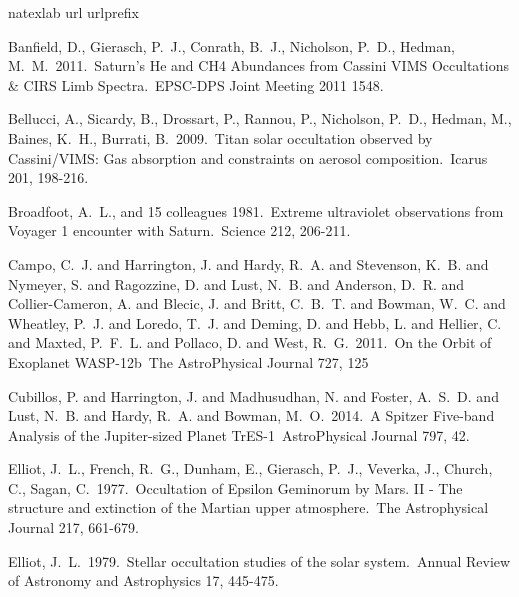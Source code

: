 \documentclass[preprint]{aastex}
\begin{document}
\begin{thebibliography}{28}
\expandafter\ifx\csname natexlab\endcsname\relax\def\natexlab#1{#1}\fi
\expandafter\ifx\csname url\endcsname\relax
 \def\url#1{\texttt{#1}}\fi
\expandafter\ifx\csname urlprefix\endcsname\relax\def\urlprefix{URL }\fi
\providecommand{\eprint}[2][]{\url{#2}}

 Banfield, D., Gierasch, P.~J., 
Conrath, B.~J., Nicholson, P.~D., Hedman, M.~M.\ 2011.\ Saturn's He and CH4 
Abundances from Cassini VIMS Occultations \& CIRS Limb Spectra.\ EPSC-DPS 
Joint Meeting 2011 1548. 

 Bellucci, A., Sicardy, B., Drossart, P., 
Rannou, P., Nicholson, P.~D., Hedman, M., Baines, K.~H., Burrati, B.\ 2009.\ 
Titan solar occultation observed by Cassini/VIMS: Gas absorption and 
constraints on aerosol composition.\ Icarus 201, 198-216. 

 Broadfoot, A.~L., and 15 
colleagues 1981.\ Extreme ultraviolet observations from Voyager 1 encounter with 
Saturn.\ Science 212, 206-211. 

 {Campo}, C.~J. and {Harrington}, J.
and {Hardy}, R.~A. and {Stevenson}, K.~B. and {Nymeyer}, S. and {Ragozzine}, D.
and {Lust}, N.~B. and {Anderson}, D.~R. and {Collier-Cameron}, A. and {Blecic},
J. and {Britt}, C.~B.~T. and {Bowman}, W.~C. and {Wheatley}, P.~J. and
{Loredo}, T.~J. and {Deming}, D. and {Hebb}, L. and {Hellier}, C. and {Maxted},
P.~F.~L. and {Pollaco}, D. and {West}, R.~G.\ 2011.\ On the Orbit of Exoplanet
WASP-12b\ The AstroPhysical Journal 727, 125

 {Cubillos}, P. and {Harrington}, J. and
{Madhusudhan}, N. and {Foster}, A.~S.~D. and {Lust}, N.~B. and {Hardy}, R.~A.
and {Bowman}, M.~O.\ 2014.\ A Spitzer Five-band Analysis of the Jupiter-sized
Planet TrES-1\ AstroPhysical Journal 797, 42.

 Elliot, J.~L., French, R.~G., 
Dunham, E., Gierasch, P.~J., Veverka, J., Church, C., Sagan, C.\ 1977.\ Occultation 
of Epsilon Geminorum by Mars. II - The structure and extinction of the Martian 
upper atmosphere.\ The Astrophysical Journal 217, 661-679. 

 Elliot, J.~L.\ 1979.\ Stellar occultation 
studies of the solar system.\ Annual Review of Astronomy and Astrophysics 17, 445-475. 


\end{thebibliography}
\end{document}
